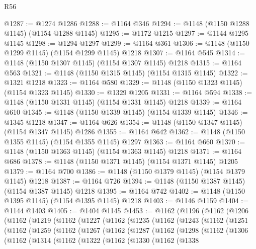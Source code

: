 \begin{lexlean}{R56}
\begin{coremodule}
@1287 := @1274 @1286
@1288 := @1164 @346
@1294 := @1148 (@1150 @1288 @1145) (@1154 @1288 @1145)
@1295 := @1172 @1215
@1297 := @1144 @1295 @1145
@1298 := @1294 @1297
@1299 := @1164 @361
@1306 := @1148 (@1150 @1299 @1145) (@1154 @1299 @1145) @1218
@1307 := @1164 @545
@1314 := @1148 (@1150 @1307 @1145) (@1154 @1307 @1145) @1218
@1315 := @1164 @563
@1321 := @1148 (@1150 @1315 @1145) (@1154 @1315 @1145)
@1322 := @1321 @1218
@1323 := @1164 @580
@1329 := @1148 (@1150 @1323 @1145) (@1154 @1323 @1145)
@1330 := @1329 @1205
@1331 := @1164 @594
@1338 := @1148 (@1150 @1331 @1145) (@1154 @1331 @1145) @1218
@1339 := @1164 @610
@1345 := @1148 (@1150 @1339 @1145) (@1154 @1339 @1145)
@1346 := @1345 @1218
@1347 := @1164 @626
@1354 := @1148 (@1150 @1347 @1145) (@1154 @1347 @1145) @1286
@1355 := @1164 @642
@1362 := @1148 (@1150 @1355 @1145) (@1154 @1355 @1145) @1297
@1363 := @1164 @660
@1370 := @1148 (@1150 @1363 @1145) (@1154 @1363 @1145) @1218
@1371 := @1164 @686
@1378 := @1148 (@1150 @1371 @1145) (@1154 @1371 @1145) @1205
@1379 := @1164 @700
@1386 := @1148 (@1150 @1379 @1145) (@1154 @1379 @1145) @1218
@1387 := @1164 @726
@1394 := @1148 (@1150 @1387 @1145) (@1154 @1387 @1145) @1218
@1395 := @1164 @742
@1402 := @1148 (@1150 @1395 @1145) (@1154 @1395 @1145) @1218
@1403 := @1146 @1159
@1404 := @1144 @1403
@1405 := @1404 @1145
@1453 := @1162
    (@1196
      (@1162
        (@1206
          (@1162
            (@1219
              (@1162
                (@1227
                  (@1162
                    (@1235
                      (@1162
                        (@1243
                          (@1162
                            (@1251
                              (@1162
                                (@1259
                                  (@1162
                                    (@1267
                                      (@1162
                                        (@1287
                                          (@1162
                                            (@1298
                                              (@1162
                                                (@1306
                                                  (@1162
                                                    (@1314
                                                      (@1162
                                                        (@1322
                                                          (@1162
                                                            (@1330
                                                              (@1162
                                                                (@1338

\end{coremodule}
\end{lexlean}
